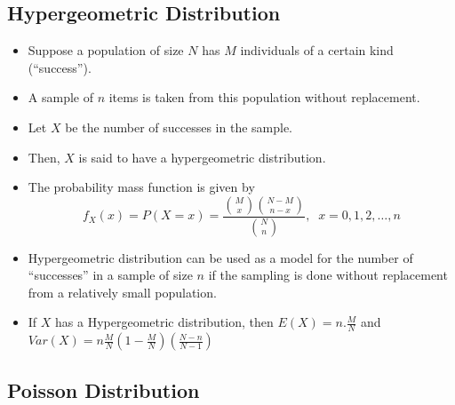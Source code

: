 \documentclass[]{book}
\begin{document}
\hypertarget{hypergeometric-distribution}{%
\subsection{Hypergeometric Distribution}\label{hypergeometric-distribution}}

\begin{itemize}
\item
  Suppose a population of size \(N\) has \(M\) individuals of a certain kind (``success'').
\item
  A sample of \(n\) items is taken from this population without replacement.
\item
  Let \(X\) be the number of successes in the sample.
\item
  Then, \(X\) is said to have a hypergeometric distribution.
\item
  The probability mass function is given by
  \[f_X(x)= P(X=x)= \frac{{M\choose x}{N-M\choose n-x}}{{N \choose n}}  , \;\; x=0,1,2,\dots, n\]
\item
  Hypergeometric distribution can be used as a model for the number of ``successes'' in a sample of size \(n\) if the sampling is done without replacement from a relatively small population.
\item
  If \(X\) has a Hypergeometric distribution, then \(E(X) = n.\frac{M}{N}\) and \(Var(X) = n\frac{M}{N}\left(1-\frac{M}{N}\right)\left(\frac{N-n}{N-1}\right)\)
\end{itemize}

\hypertarget{poisson-distribution}{%
\subsection{Poisson Distribution}\label{poisson-distribution}}
\end{document}
